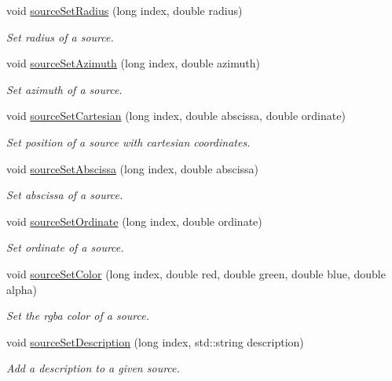 \begin{DoxyCompactItemize}
void \hyperlink{class_hoa2_d_1_1_sources_manager_a1b672413f19be1f686637f31fa1fe552}{source\-Set\-Radius} (long index, double radius)
\begin{DoxyCompactList}\small\item\em Set radius of a source. \end{DoxyCompactList}\item 
void \hyperlink{class_hoa2_d_1_1_sources_manager_a557bf63f77b7efd1fa3779da9748c1f2}{source\-Set\-Azimuth} (long index, double azimuth)
\begin{DoxyCompactList}\small\item\em Set azimuth of a source. \end{DoxyCompactList}\item 
void \hyperlink{class_hoa2_d_1_1_sources_manager_a2bed146ea0bdb28d9c1aab0efa157805}{source\-Set\-Cartesian} (long index, double abscissa, double ordinate)
\begin{DoxyCompactList}\small\item\em Set position of a source with cartesian coordinates. \end{DoxyCompactList}\item 
void \hyperlink{class_hoa2_d_1_1_sources_manager_a849c9d3fa30ecd876144f40e7b8ace61}{source\-Set\-Abscissa} (long index, double abscissa)
\begin{DoxyCompactList}\small\item\em Set abscissa of a source. \end{DoxyCompactList}\item 
void \hyperlink{class_hoa2_d_1_1_sources_manager_a404a57bf0c20882d9a205d42bcd9535c}{source\-Set\-Ordinate} (long index, double ordinate)
\begin{DoxyCompactList}\small\item\em Set ordinate of a source. \end{DoxyCompactList}\item 
void \hyperlink{class_hoa2_d_1_1_sources_manager_aa8b1d3855a46d1fa49215701b9d491c6}{source\-Set\-Color} (long index, double red, double green, double blue, double alpha)
\begin{DoxyCompactList}\small\item\em Set the rgba color of a source. \end{DoxyCompactList}\item 
void \hyperlink{class_hoa2_d_1_1_sources_manager_a180c0eb17336966075a11ce2e1623ee0}{source\-Set\-Description} (long index, std\-::string description)
\begin{DoxyCompactList}\small\item\em Add a description to a given source. \end{DoxyCompactList}\item 

\end{DoxyCompactItemize}
